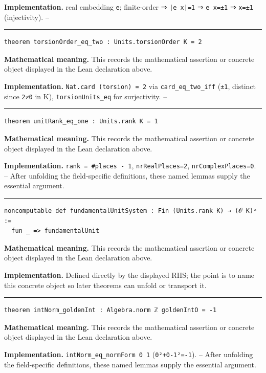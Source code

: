 \documentclass[UTF8,a4paper,11pt,fontset=fandol]{ctexart}
\theoremstyle{definition}
\newcommand{\statementsep}{\par\medskip\hrule\medskip}
\begin{document}
\noindent\textbf{Implementation.} real embedding \texttt{e}; finite-order ⇒ \texttt{|e x|=1} ⇒ \texttt{e x=±1} ⇒ \texttt{x=±1} (injectivity). --\par
\statementsep
\begin{verbatim}
theorem torsionOrder_eq_two : Units.torsionOrder K = 2
\end{verbatim}
\noindent\textbf{Mathematical meaning.} This records the mathematical assertion or concrete object displayed in the Lean declaration above.\par
\noindent\textbf{Implementation.} \texttt{Nat.\allowbreak{}card (torsion) = 2} via \texttt{card\_\allowbreak{}eq\_\allowbreak{}two\_\allowbreak{}iff} (\texttt{±1}, distinct since \texttt{2≠0} in K), \texttt{torsionUnits\_\allowbreak{}eq} for surjectivity. --\par
\statementsep
\begin{verbatim}
theorem unitRank_eq_one : Units.rank K = 1
\end{verbatim}
\noindent\textbf{Mathematical meaning.} This records the mathematical assertion or concrete object displayed in the Lean declaration above.\par
\noindent\textbf{Implementation.} \texttt{rank = \#places - 1}, \texttt{nrRealPlaces=2}, \texttt{nrComplexPlaces=0}. -- After unfolding the field-specific definitions, these named lemmas supply the essential argument.\par
\statementsep
\begin{verbatim}
noncomputable def fundamentalUnitSystem : Fin (Units.rank K) → (𝓞 K)ˣ :=
  fun _ => fundamentalUnit
\end{verbatim}
\noindent\textbf{Mathematical meaning.} This records the mathematical assertion or concrete object displayed in the Lean declaration above.\par
\noindent\textbf{Implementation.} Defined directly by the displayed RHS; the point is to name this concrete object so later theorems can unfold or transport it.\par
\statementsep
\begin{verbatim}
theorem intNorm_goldenInt : Algebra.norm ℤ goldenIntO = -1
\end{verbatim}
\noindent\textbf{Mathematical meaning.} This records the mathematical assertion or concrete object displayed in the Lean declaration above.\par
\noindent\textbf{Implementation.} \texttt{intNorm\_\allowbreak{}eq\_\allowbreak{}normForm 0 1} (\texttt{0²+0-1²=-1}). -- After unfolding the field-specific definitions, these named lemmas supply the essential argument.\par
\end{document}
